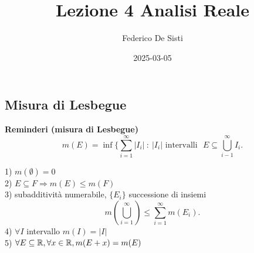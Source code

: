 \documentclass[12px]{article}
\title{Lezione 4 Analisi Reale}
\date{2025-03-05}
\author{Federico De Sisti}
\begin{document}
	\maketitle
	\newpage
	\subsection{Misura di Lesbegue}
	\textbf{Reminderi (misura di Lesbegue)}\\
	\[
	m(E) = \inf\{ \sum^\infty_{i=1} |I_i| \ :\ |I_i| \text{ intervalli} \ \ \ E\subseteq \bigcup^\infty_{i-1}I_i 
	.\] 
	\begin{prop}
	1) $m(\emptyset) = 0$	\\
	2) $E\subseteq F \Rightarrow m(E)\leq m(F)$ \\
	3) subadditività numerabile, $\{E_i\}$ successione di insiemi
	 \[
		 m(\bigcup^\infty_{i=1}) \leq \sum^{\infty}_{i=1}m(E_i)
	.\] 
	4) $\forall I$ intervallo  $m(I) = |I|$\\
	5)  $\forall E\subseteq \mathbb{R}, \forall x\in\mathbb{R}, m(E + x) = m(E)$
	\end{prop}
\end{document}
